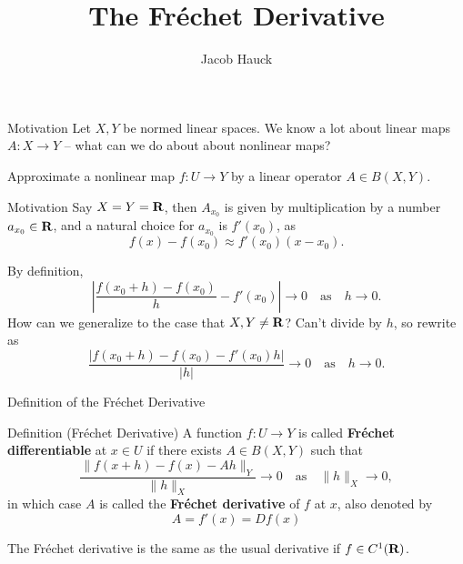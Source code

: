 \documentclass[]{beamer}
\title{The Fréchet Derivative}
\author{Jacob Hauck}
\institute{Math 6418}
\date{}
\begin{document}
	\frame{\titlepage}
	
	\begin{frame}{Motivation}
		Let $X,Y$ be normed linear spaces. We know a lot about linear maps $A : X \to Y$ -- what can we do about about nonlinear maps?
		\vfill
		\pause
		
		Approximate a nonlinear map $f : U \to Y$ by a linear operator $A \in B(X,Y)$.
	\end{frame}
	
	\begin{frame}{Motivation}
		Say $X = Y = \textnormal{\bf R}$, then $A_{x_0}$ is given by multiplication by a number $a_{x_0} \in \textnormal{\bf R}$, and a natural choice for $a_{x_0}$ is $f'(x_0)$, as
		\begin{equation*}
			f(x) - f(x_0) \approx f'(x_0)(x-x_0).
		\end{equation*}
		\vfill
		\pause
		
		By definition,
		\begin{equation*}
			\left|\frac{f(x_0+h) - f(x_0)}{h} - f'(x_0)\right| \to 0 \quad\text{as}\quad h\to 0.
		\end{equation*}
		\pause
		How can we generalize to the case that $X,Y \ne \textnormal{\bf R}$? Can't divide by $h$, so rewrite as
		\begin{equation*}
			\frac{|f(x_0+h) - f(x_0) - f'(x_0)h|}{|h|} \to 0 \quad \text{as}\quad h\to0.
		\end{equation*}
	\end{frame}
	
	\begin{frame}{Definition of the Fréchet Derivative}
		\begin{block}{Definition (Fréchet Derivative)}
		A function $f : U \to Y$ is called \textbf{Fréchet differentiable} at $x \in U$ if there exists $A \in B(X,Y)$ such that
		\begin{equation*}
			\frac{\lVert f(x+h) - f(x) - Ah \rVert_Y}{\lVert h \rVert_X} \to 0 \quad \text{as} \quad \lVert h\rVert_X\to 0,
		\end{equation*}
		in which case $A$ is called the \textbf{Fréchet derivative} of $f$ at $x$, also denoted by
		\begin{equation*}
			A = f'(x) = Df(x)
		\end{equation*}
		\end{block}
		\vfill
		\pause
		
		The Fréchet derivative is the same as the usual derivative if $f \in C^1(\textnormal{\bf R})$.
	\end{frame}
	
\end{document}
